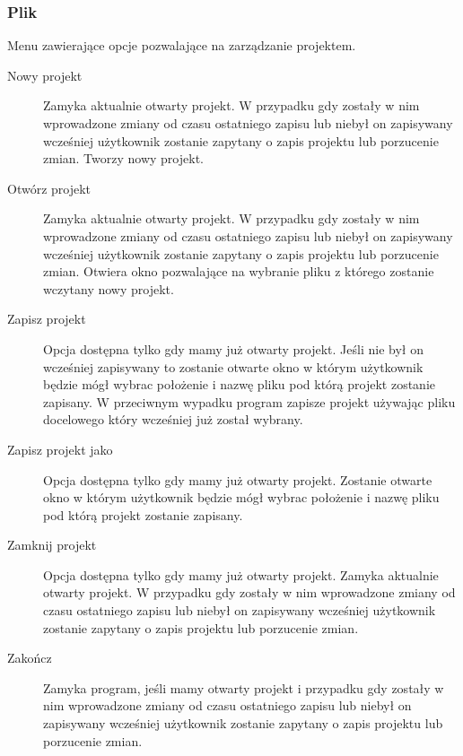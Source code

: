 \documentclass[a4paper,10pt]{article}
\begin{document}
\subsubsection{Plik}
Menu zawierające opcje pozwalające na zarządzanie projektem.
\begin{description}
\item[Nowy projekt] Zamyka aktualnie otwarty projekt. W przypadku gdy zostały w nim wprowadzone zmiany od czasu ostatniego zapisu lub niebył on zapisywany wcześniej użytkownik zostanie zapytany o zapis projektu lub porzucenie zmian. Tworzy nowy projekt.
\item[Otwórz projekt] Zamyka aktualnie otwarty projekt. W przypadku gdy zostały w nim wprowadzone zmiany od czasu ostatniego zapisu lub niebył on zapisywany wcześniej użytkownik zostanie zapytany o zapis projektu lub porzucenie zmian. Otwiera okno pozwalające na wybranie pliku z którego zostanie wczytany nowy projekt.
\item[Zapisz projekt] Opcja dostępna tylko gdy mamy już otwarty projekt. Jeśli nie był on wcześniej zapisywany to zostanie otwarte okno w którym użytkownik będzie mógł wybrac położenie i nazwę pliku pod którą projekt zostanie zapisany. W przeciwnym wypadku program zapisze projekt używając pliku docelowego który wcześniej już został wybrany.
\item[Zapisz projekt jako] Opcja dostępna tylko gdy mamy już otwarty projekt. Zostanie otwarte okno w którym użytkownik będzie mógł wybrac położenie i nazwę pliku pod którą projekt zostanie zapisany.
\item[Zamknij projekt] Opcja dostępna tylko gdy mamy już otwarty projekt. Zamyka aktualnie otwarty projekt. W przypadku gdy zostały w nim wprowadzone zmiany od czasu ostatniego zapisu lub niebył on zapisywany wcześniej użytkownik zostanie zapytany o zapis projektu lub porzucenie zmian.
\item[Zakończ] Zamyka program, jeśli mamy otwarty projekt i przypadku gdy zostały w nim wprowadzone zmiany od czasu ostatniego zapisu lub niebył on zapisywany wcześniej użytkownik zostanie zapytany o zapis projektu lub porzucenie zmian. 
\end{description}
\end{document}

